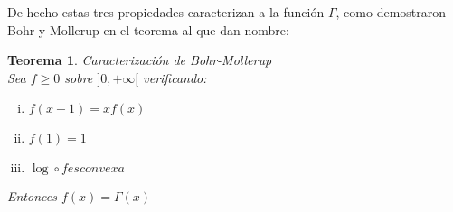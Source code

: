 \documentclass[a4paper, 11pt]{amsart}
\newtheorem{theorem}{Teorema}[section]
\theoremstyle{definition}
\theoremstyle{remark}
\numberwithin{equation}{section}
\begin{document}
  De hecho estas tres propiedades caracterizan a la función $\Gamma$, como demostraron Bohr y
  Mollerup en el teorema al que dan nombre:
      
  \begin{theorem}{Caracterización de Bohr-Mollerup}\\
  
  Sea $f\ge 0$ sobre $]0,+\infty[$ verificando:
  
  \begin{enumerate}[i.]
   \item $f(x+1) = xf(x)$
   \item $f(1) = 1$
   \item $\log \circ f es convexa$
  \end{enumerate}
  
   Entonces $f(x) = \Gamma(x)$
  \label{caracterizacion}
  \end{theorem}
\end{document}
